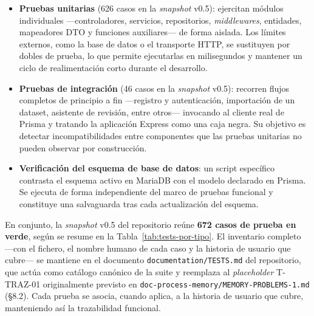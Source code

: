 \begin{itemize}
	\item \textbf{Pruebas unitarias} (626 casos en la \textit{snapshot} v0.5):
	      ejercitan módulos individuales ---controladores, servicios, repositorios,
	      \textit{middlewares}, entidades, mapeadores DTO y funciones auxiliares--- de
	      forma aislada. Los límites externos, como la base de datos o el transporte
	      HTTP, se sustituyen por dobles de prueba, lo que permite ejecutarlas en
	      milisegundos y mantener un ciclo de realimentación corto durante el
	      desarrollo.
	\item \textbf{Pruebas de integración} (46 casos en la \textit{snapshot} v0.5):
	      recorren flujos completos de principio a fin ---registro y autenticación,
	      importación de un dataset, asistente de revisión, entre otros--- invocando al
	      cliente real de Prisma y tratando la aplicación Express como una caja negra.
	      Su objetivo es detectar incompatibilidades entre componentes que las pruebas
	      unitarias no pueden observar por construcción.
	\item \textbf{Verificación del esquema de base de datos}: un script específico
	      contrasta el esquema activo en MariaDB con el modelo declarado en Prisma. Se
	      ejecuta de forma independiente del marco de pruebas funcional y constituye una
	      salvaguarda tras cada actualización del esquema.
\end{itemize}

En conjunto, la \textit{snapshot} v0.5 del repositorio reúne
\textbf{672 casos de prueba en verde}, según se resume en la
Tabla~\ref{tab:tests-por-tipo}. El inventario completo ---con el fichero, el
nombre humano de cada caso y la historia de usuario que cubre--- se mantiene
en el documento \texttt{documentation/TESTS.md} del repositorio, que actúa
como catálogo canónico de la suite y reemplaza al \textit{placeholder}
T-TRAZ-01 originalmente previsto en
\texttt{doc-process-memory/MEMORY-PROBLEMS-1.md} (§8.2). Cada prueba se
asocia, cuando aplica, a la historia de usuario que cubre, manteniendo así
la trazabilidad funcional.

